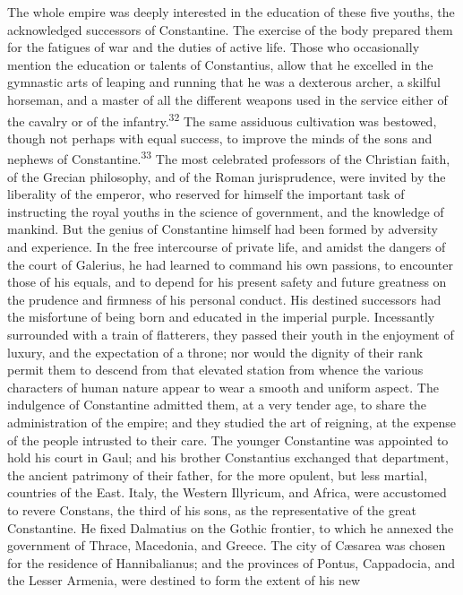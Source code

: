 The whole empire was deeply interested in the education of these
five youths, the acknowledged successors of Constantine. The
exercise of the body prepared them for the fatigues of war and
the duties of active life. Those who occasionally mention the
education or talents of Constantius, allow that he excelled in
the gymnastic arts of leaping and running that he was a dexterous
archer, a skilful horseman, and a master of all the different
weapons used in the service either of the cavalry or of the
infantry.\textsuperscript{32} The same assiduous cultivation was bestowed, though
not perhaps with equal success, to improve the minds of the sons
and nephews of Constantine.\textsuperscript{33} The most celebrated professors of
the Christian faith, of the Grecian philosophy, and of the Roman
jurisprudence, were invited by the liberality of the emperor, who
reserved for himself the important task of instructing the royal
youths in the science of government, and the knowledge of
mankind. But the genius of Constantine himself had been formed by
adversity and experience. In the free intercourse of private
life, and amidst the dangers of the court of Galerius, he had
learned to command his own passions, to encounter those of his
equals, and to depend for his present safety and future greatness
on the prudence and firmness of his personal conduct. His
destined successors had the misfortune of being born and educated
in the imperial purple. Incessantly surrounded with a train of
flatterers, they passed their youth in the enjoyment of luxury,
and the expectation of a throne; nor would the dignity of their
rank permit them to descend from that elevated station from
whence the various characters of human nature appear to wear a
smooth and uniform aspect. The indulgence of Constantine admitted
them, at a very tender age, to share the administration of the
empire; and they studied the art of reigning, at the expense of
the people intrusted to their care. The younger Constantine was
appointed to hold his court in Gaul; and his brother Constantius
exchanged that department, the ancient patrimony of their father,
for the more opulent, but less martial, countries of the East.
Italy, the Western Illyricum, and Africa, were accustomed to
revere Constans, the third of his sons, as the representative of
the great Constantine. He fixed Dalmatius on the Gothic frontier,
to which he annexed the government of Thrace, Macedonia, and
Greece. The city of Cæsarea was chosen for the residence of
Hannibalianus; and the provinces of Pontus, Cappadocia, and the
Lesser Armenia, were destined to form the extent of his new
